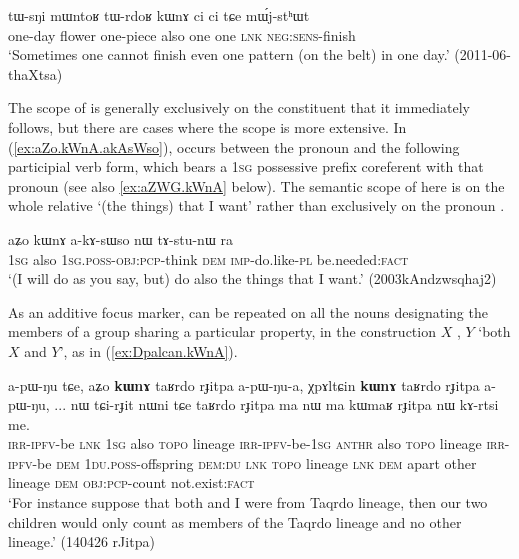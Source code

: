 \begin{exe}
\ex \label{ex:tWrdoR.kWnA}
\gll tɯ-sŋi mɯntoʁ tɯ-rdoʁ kɯnɤ ci ci tɕe mɯ́j-stʰɯt \\
one-day flower one-piece also one one \textsc{lnk} \textsc{neg}:\textsc{sens}-finish \\
\glt `Sometimes one cannot finish even one pattern (on the belt) in one day.' (2011-06-thaXtsa)
\end{exe}

The scope of   is generally exclusively on the constituent that it immediately follows, but there are cases where the scope is more extensive. In (\ref{ex:aZo.kWnA.akAsWso}),  occurs between the pronoun  and the following participial verb form, which bears a \textsc{1sg} possessive prefix  coreferent with that pronoun (see also \ref{ex:aZWG.kWnA} below). The semantic scope of  here is on the whole relative  `(the things) that I want' rather than exclusively on the pronoun .

\begin{exe}
\ex \label{ex:aZo.kWnA.akAsWso}
 \gll aʑo kɯnɤ a-kɤ-sɯso nɯ tɤ-stu-nɯ ra \\
 \textsc{1sg} also \textsc{1sg}.\textsc{poss}-\textsc{obj}:\textsc{pcp}-think \textsc{dem} \textsc{imp}-do.like-\textsc{pl} be.needed:\textsc{fact} \\
 \glt `(I will do as you say, but) do also the things that I want.' (2003kAndzwsqhaj2)
\end{exe}

As an additive focus marker,  can be repeated on all the nouns designating the members of a group sharing a particular property, in the construction $X$ , $Y$   `both $X$ and $Y$', as in (\ref{ex:Dpalcan.kWnA}).


\begin{exe}
\ex \label{ex:Dpalcan.kWnA}
 \gll a-pɯ-ŋu tɕe, aʑo \textbf{kɯnɤ} taʁrdo rɟitpa a-pɯ-ŋu-a, χpɤltɕin \textbf{kɯnɤ} taʁrdo rɟitpa a-pɯ-ŋu, ... nɯ tɕi-rɟit nɯni tɕe taʁrdo rɟitpa ma nɯ ma kɯmaʁ rɟitpa nɯ kɤ-rtsi me.  \\
 \textsc{irr}-\textsc{ipfv}-be \textsc{lnk} \textsc{1sg} also  \textsc{topo} lineage  \textsc{irr}-\textsc{ipfv}-be-\textsc{1sg}   \textsc{anthr} also  \textsc{topo} lineage  \textsc{irr}-\textsc{ipfv}-be { } \textsc{dem} \textsc{1du}.\textsc{poss}-offspring \textsc{dem}:\textsc{du} \textsc{lnk}  \textsc{topo} lineage \textsc{lnk} \textsc{dem} apart other lineage \textsc{dem} \textsc{obj}:\textsc{pcp}-count not.exist:\textsc{fact} \\
 \glt `For instance suppose that both  and I were from Taqrdo lineage, then our two children would only count as members of the Taqrdo lineage and no other lineage.' (140426 rJitpa)
\end{exe}

